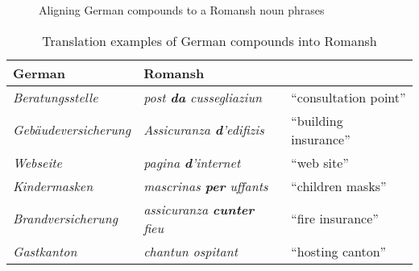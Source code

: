 
\begin{figure}[ht]
\begin{subfigure}{.5\textwidth}
\centering
        \vspace*{1cm}
        
           
    
\end{subfigure}
\begin{subfigure}{.5\textwidth}
\centering
        \vspace*{1cm}
        
           
    
\end{subfigure}
\caption{Aligning German compounds to a Romansh noun phrases}
\label{fig:align-compounds}
\end{figure}

\begin{table}
	\begin{center}
	\begin{tabular}{lll}
		\toprule
		German & Romansh &  \\
		\midrule
		\emph{Beratungsstelle} & \emph{post \textbf{da} cussegliaziun} & \enquote{consultation point} \\
		\emph{Gebäudeversicherung} & \emph{Assicuranza \textbf{d}'edifizis} & \enquote{building insurance} \\
		\emph{Webseite} & \emph{pagina \textbf{d}'internet} & \enquote{web site} \\
		\emph{Kindermasken} & \emph{mascrinas \textbf{per} uffants} & \enquote{children masks} \\
		\emph{Brandversicherung} & \emph{assicuranza \textbf{cunter} fieu} & \enquote{fire insurance} \\
		\emph{Gastkanton} & \emph{chantun ospitant} & \enquote{hosting canton} \\
		\bottomrule
	\end{tabular}
	\caption{Translation examples of German compounds into Romansh}
	\label{tab:compounds}
	\end{center}
\end{table}

